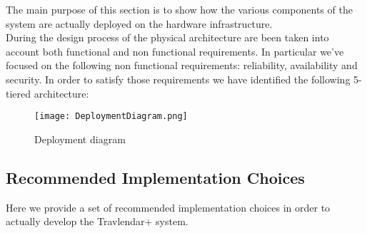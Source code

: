 The main purpose of this section is to show how the various components of the system are actually deployed on the hardware infrastructure.\\
During the design process of the physical architecture are been taken into account both functional and non functional requirements. In particular we've focused on the following non functional requirements: reliability, availability and security. In order to satisfy those requirements we have identified the following 5-tiered architecture:
\begin{figure}[H]
\begin{center}
		\texttt{[image: DeploymentDiagram.png]}
\end{center}
\caption{Deployment diagram}
\end{figure}

\subsection{Recommended Implementation Choices}
\label{subsect:Recommended Implementation Choices}
Here we provide a set of recommended implementation choices in order to actually develop the Travlendar+ system.
